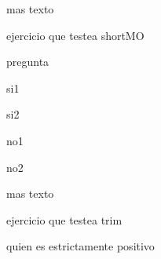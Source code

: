 \documentclass{gift}
\begin{document}
\begin{giftFragmento}
mas texto\end  {giftFragmento}


\begin{giftComentario}

\end  {giftComentario}

\begin{giftComentario}
ejercicio que testea shortMO
\end  {giftComentario}
\begin{giftFragmento}
pregunta\end  {giftFragmento}


\begin{giftMO}
\item \begin{giftFragmento}
si1\end  {giftFragmento}


\item \begin{giftFragmento}
si2\end  {giftFragmento}


\item \begin{giftFragmento}
no1\end  {giftFragmento}


\item \begin{giftFragmento}
no2\end  {giftFragmento}


\end  {giftMO}

\begin{giftFragmento}
mas texto\end  {giftFragmento}


\begin{giftComentario}

\end  {giftComentario}

\begin{giftComentario}
ejercicio que testea trim
\end  {giftComentario}
\begin{giftFragmento}
quien es estrictamente positivo\end  {giftFragmento}
\end{document}
